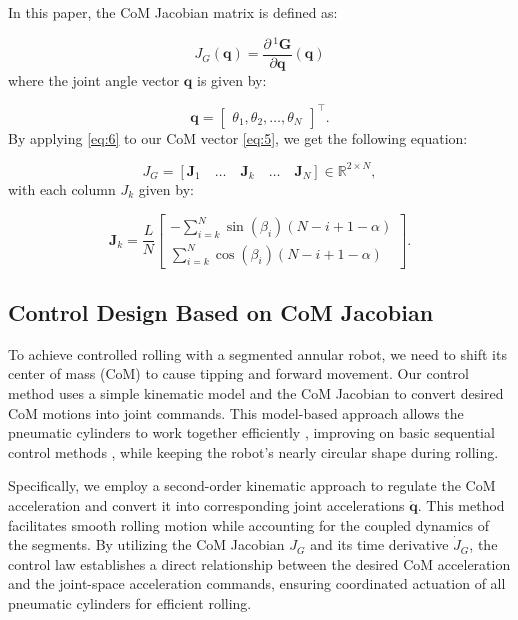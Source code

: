\documentclass[a4paper, 10pt, conference]{ieeeconf}
\begin{document}
In this paper, the CoM Jacobian matrix is defined as:

\begin{equation}
    J_G(\mathbf{q}) = \frac{\partial \, {}^{1}\mathbf{G}}{\partial \mathbf{q}}(\mathbf{q})
		\label{eq:6}
\end{equation}
\noindent
where the joint angle vector $\mathbf{q}$ is given by:

\begin{equation}
    \mathbf{q} =
    \begin{bmatrix}
        \theta_1, \theta_2, \dots, \theta_N
    \end{bmatrix}^\top .
\end{equation}
\noindent
By applying \eqref{eq:6} to our CoM vector \eqref{eq:5}, we get the following equation:

\begin{equation}
J_G = [\mathbf{J}_1 \quad \dots \quad \mathbf{J}_k \quad \dots \quad \mathbf{J}_N] \in \mathbb{R}^{2 \times N},
\end{equation}
\noindent
with each column \(J_k\) given by:

\begin{equation}
\mathbf{J}_k = \frac{L}{N}
\begin{bmatrix} 
-\displaystyle\sum_{i=k}^{N}\sin(\beta_i)(N - i + 1 - \alpha) \\[6pt]
 \displaystyle\sum_{i=k}^{N}\cos(\beta_i)(N - i + 1 - \alpha)
\end{bmatrix}.
\end{equation}
\noindent


\subsection{Control Design Based on CoM Jacobian}

To achieve controlled rolling with a segmented annular robot, we need to shift its center of mass (CoM) to cause tipping and forward movement. Our control method uses a simple kinematic model and the CoM Jacobian to convert desired CoM motions into joint commands. This model-based approach allows the pneumatic cylinders to work together efficiently \cite{b10}, improving on basic sequential control methods \cite{b1}, while keeping the robot’s nearly circular shape during rolling.

Specifically, we employ a second-order kinematic approach to regulate the CoM acceleration and convert it into corresponding joint accelerations \(\ddot{\mathbf{q}}\). This method facilitates smooth rolling motion while accounting for the coupled dynamics of the segments. By utilizing the CoM Jacobian \(J_G\) and its time derivative \(\dot{J}_G\), the control law establishes a direct relationship between the desired CoM acceleration and the joint-space acceleration commands, ensuring coordinated actuation of all pneumatic cylinders for efficient rolling.
\end{document}
